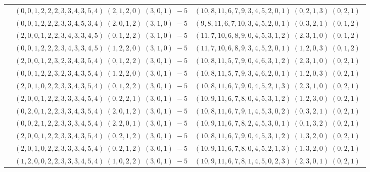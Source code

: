 \documentclass[11pt]{article}
\begin{document}
\begin{longtable}[l]{|c|c|c|}
 \cline{2-3} 
 & $(0 ,0 ,1 ,2 ,2 ,2 ,3 ,3 ,4 ,3 ,5 ,4) \;(2 ,1 ,2 ,0) \;(3 ,0 ,1) \;-5$ & $(10 ,8 ,11 ,6 ,7 ,9 ,3 ,4 ,5 ,2 ,0 ,1) \;(0 ,2 ,1 ,3) \;(0 ,2 ,1) \;$\\ 
 \cline{2-3} 
 & $(0 ,0 ,1 ,2 ,2 ,2 ,3 ,3 ,4 ,5 ,3 ,4) \;(2 ,0 ,1 ,2) \;(3 ,1 ,0) \;-5$ & $(9 ,8 ,11 ,6 ,7 ,10 ,3 ,4 ,5 ,2 ,0 ,1) \;(0 ,3 ,2 ,1) \;(0 ,1 ,2) \;$\\ 
 \cline{2-3} 
 & $(2 ,0 ,0 ,1 ,2 ,2 ,3 ,4 ,3 ,3 ,4 ,5) \;(0 ,1 ,2 ,2) \;(3 ,1 ,0) \;-5$ & $(11 ,7 ,10 ,6 ,8 ,9 ,0 ,4 ,5 ,3 ,1 ,2) \;(2 ,3 ,1 ,0) \;(0 ,1 ,2) \;$\\ 
 \cline{2-3} 
 & $(0 ,0 ,1 ,2 ,2 ,2 ,3 ,4 ,3 ,3 ,4 ,5) \;(1 ,2 ,2 ,0) \;(3 ,1 ,0) \;-5$ & $(11 ,7 ,10 ,6 ,8 ,9 ,3 ,4 ,5 ,2 ,0 ,1) \;(1 ,2 ,0 ,3) \;(0 ,1 ,2) \;$\\ 
 \cline{2-3} 
 & $(2 ,0 ,0 ,1 ,2 ,3 ,2 ,3 ,4 ,3 ,5 ,4) \;(0 ,1 ,2 ,2) \;(3 ,0 ,1) \;-5$ & $(10 ,8 ,11 ,5 ,7 ,9 ,0 ,4 ,6 ,3 ,1 ,2) \;(2 ,3 ,1 ,0) \;(0 ,2 ,1) \;$\\ 
 \cline{2-3} 
 & $(0 ,0 ,1 ,2 ,2 ,3 ,2 ,3 ,4 ,3 ,5 ,4) \;(1 ,2 ,2 ,0) \;(3 ,0 ,1) \;-5$ & $(10 ,8 ,11 ,5 ,7 ,9 ,3 ,4 ,6 ,2 ,0 ,1) \;(1 ,2 ,0 ,3) \;(0 ,2 ,1) \;$\\ 
 \cline{2-3} 
 & $(2 ,0 ,1 ,0 ,2 ,2 ,3 ,3 ,4 ,3 ,5 ,4) \;(0 ,1 ,2 ,2) \;(3 ,0 ,1) \;-5$ & $(10 ,8 ,11 ,6 ,7 ,9 ,0 ,4 ,5 ,2 ,1 ,3) \;(2 ,3 ,1 ,0) \;(0 ,2 ,1) \;$\\ 
 \cline{2-3} 
 & $(2 ,0 ,0 ,1 ,2 ,2 ,3 ,3 ,3 ,4 ,5 ,4) \;(0 ,2 ,2 ,1) \;(3 ,0 ,1) \;-5$ & $(10 ,9 ,11 ,6 ,7 ,8 ,0 ,4 ,5 ,3 ,1 ,2) \;(1 ,2 ,3 ,0) \;(0 ,2 ,1) \;$\\ 
 \cline{2-3} 
 & $(0 ,2 ,0 ,1 ,2 ,2 ,3 ,3 ,4 ,3 ,5 ,4) \;(2 ,0 ,1 ,2) \;(3 ,0 ,1) \;-5$ & $(10 ,8 ,11 ,6 ,7 ,9 ,1 ,4 ,5 ,3 ,0 ,2) \;(0 ,3 ,2 ,1) \;(0 ,2 ,1) \;$\\ 
 \cline{2-3} 
 & $(0 ,0 ,2 ,1 ,2 ,2 ,3 ,3 ,3 ,4 ,5 ,4) \;(2 ,2 ,0 ,1) \;(3 ,0 ,1) \;-5$ & $(10 ,9 ,11 ,6 ,7 ,8 ,2 ,4 ,5 ,3 ,0 ,1) \;(0 ,1 ,3 ,2) \;(0 ,2 ,1) \;$\\ 
 \cline{2-3} 
 & $(2 ,0 ,0 ,1 ,2 ,2 ,3 ,3 ,4 ,3 ,5 ,4) \;(0 ,2 ,1 ,2) \;(3 ,0 ,1) \;-5$ & $(10 ,8 ,11 ,6 ,7 ,9 ,0 ,4 ,5 ,3 ,1 ,2) \;(1 ,3 ,2 ,0) \;(0 ,2 ,1) \;$\\ 
 \cline{2-3} 
 & $(2 ,0 ,1 ,0 ,2 ,2 ,3 ,3 ,3 ,4 ,5 ,4) \;(0 ,2 ,1 ,2) \;(3 ,0 ,1) \;-5$ & $(10 ,9 ,11 ,6 ,7 ,8 ,0 ,4 ,5 ,2 ,1 ,3) \;(1 ,3 ,2 ,0) \;(0 ,2 ,1) \;$\\ 
 \cline{2-3} 
 & $(1 ,2 ,0 ,0 ,2 ,2 ,3 ,3 ,3 ,4 ,5 ,4) \;(1 ,0 ,2 ,2) \;(3 ,0 ,1) \;-5$ & $(10 ,9 ,11 ,6 ,7 ,8 ,1 ,4 ,5 ,0 ,2 ,3) \;(2 ,3 ,0 ,1) \;(0 ,2 ,1) \;$\\ 

\end{longtable}
\end{document}
